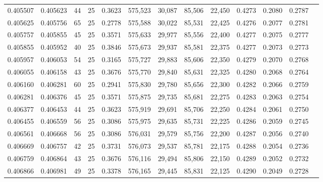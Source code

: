\begin{tabular}{rrrrrrrrrrrrr}
0.405507 & 0.405623 &    44 &  25 &                                     0.3623 & 575,523 &  30,087 &  85,506 &  22,450 & 0.4273 & 0.2080 & 0.2787 \\
0.405625 & 0.405756 &    65 &  25 &                                     0.2778 & 575,588 &  30,022 &  85,531 &  22,425 & 0.4276 & 0.2077 & 0.2781 \\
0.405757 & 0.405855 &    45 &  25 &                                     0.3571 & 575,633 &  29,977 &  85,556 &  22,400 & 0.4277 & 0.2075 & 0.2777 \\
0.405855 & 0.405952 &    40 &  25 &                                     0.3846 & 575,673 &  29,937 &  85,581 &  22,375 & 0.4277 & 0.2073 & 0.2773 \\
0.405957 & 0.406053 &    54 &  25 &                                     0.3165 & 575,727 &  29,883 &  85,606 &  22,350 & 0.4279 & 0.2070 & 0.2768 \\
0.406055 & 0.406158 &    43 &  25 &                                     0.3676 & 575,770 &  29,840 &  85,631 &  22,325 & 0.4280 & 0.2068 & 0.2764 \\
0.406160 & 0.406281 &    60 &  25 &                                     0.2941 & 575,830 &  29,780 &  85,656 &  22,300 & 0.4282 & 0.2066 & 0.2759 \\
0.406281 & 0.406376 &    45 &  25 &                                     0.3571 & 575,875 &  29,735 &  85,681 &  22,275 & 0.4283 & 0.2063 & 0.2754 \\
0.406377 & 0.406453 &    44 &  25 &                                     0.3623 & 575,919 &  29,691 &  85,706 &  22,250 & 0.4284 & 0.2061 & 0.2750 \\
0.406455 & 0.406559 &    56 &  25 &                                     0.3086 & 575,975 &  29,635 &  85,731 &  22,225 & 0.4286 & 0.2059 & 0.2745 \\
0.406561 & 0.406668 &    56 &  25 &                                     0.3086 & 576,031 &  29,579 &  85,756 &  22,200 & 0.4287 & 0.2056 & 0.2740 \\
0.406669 & 0.406757 &    42 &  25 &                                     0.3731 & 576,073 &  29,537 &  85,781 &  22,175 & 0.4288 & 0.2054 & 0.2736 \\
0.406759 & 0.406864 &    43 &  25 &                                     0.3676 & 576,116 &  29,494 &  85,806 &  22,150 & 0.4289 & 0.2052 & 0.2732 \\
0.406866 & 0.406981 &    49 &  25 &                                     0.3378 & 576,165 &  29,445 &  85,831 &  22,125 & 0.4290 & 0.2049 & 0.2728 \\

\end{tabular}

